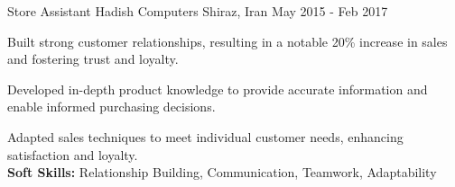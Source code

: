 \begin{cventries}
    \cventry
    {Store Assistant} %
    {Hadish Computers} %
    {Shiraz, Iran} %
    {May 2015 - Feb 2017} %
    {
      \begin{cvitems} %
        \item {Built strong customer relationships, resulting in a notable 20\% increase in sales and fostering trust and loyalty.}
        \item {Developed in-depth product knowledge to provide accurate information and enable informed purchasing decisions.}
        \item {Adapted sales techniques to meet individual customer needs, enhancing satisfaction and loyalty.
        \\\textbf{Soft Skills:} Relationship Building, Communication, Teamwork, Adaptability}
      \end{cvitems}
    }
\end{cventries}
